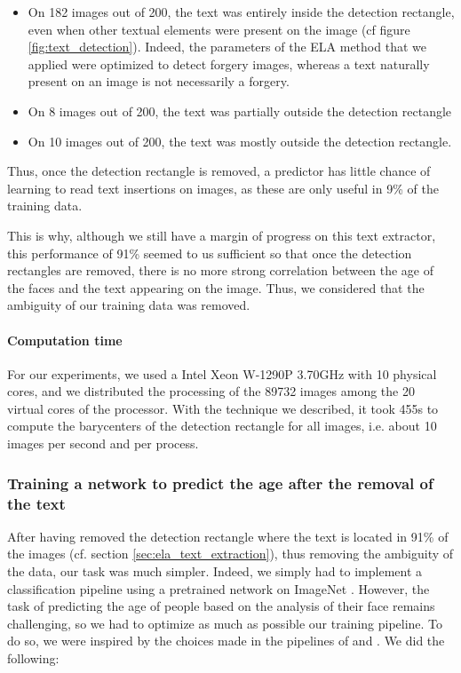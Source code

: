 \documentclass[sigconf, nonacm]{acmart}
\begin{document}
\begin{itemize}
    \item On 182 images out of 200, the text was entirely inside the detection rectangle, even when other textual elements were present on the image (cf figure \ref{fig:text_detection}). Indeed, the parameters of the ELA method that we applied were optimized to detect forgery images, whereas a text naturally present on an image is not necessarily a forgery.
    \item On 8 images out of 200, the text was partially outside the detection rectangle
    \item On 10 images out of 200, the text was mostly outside the detection rectangle.
\end{itemize}

Thus, once the detection rectangle is removed, a predictor has little chance of learning to read text insertions on images, as these are only useful in 9\% of the training data. 

This is why, although we still have a margin of progress on this text extractor, this performance of 91\% seemed to us sufficient so that once the detection rectangles are removed, there is no more strong correlation between the age of the faces and the text appearing on the image. Thus, we considered that the ambiguity of our training data was removed.

\paragraph{Computation time} For our experiments, we used a Intel Xeon W-1290P 3.70GHz with 10 physical cores, and we distributed the processing of the 89732 images among the 20 virtual cores of the processor. With the technique we described, it took 455s to compute the barycenters of the detection rectangle for all images, i.e. about 10 images per second and per process.

\subsubsection{Training a network to predict the age after the removal of the text}

After having removed the detection rectangle where the text is located in 91\% of the images (cf. section \ref{sec:ela_text_extraction}), thus removing the ambiguity of the data, our task was much simpler. Indeed, we simply had to implement a classification pipeline using a pretrained network on ImageNet \cite{deng_imagenet_2009}. However, the task of predicting the age of people based on the analysis of their face remains challenging, so we had to optimize as much as possible our training pipeline. To do so, we were inspired by the choices made in the pipelines of \cite{qawaqneh_deep_2017} and \cite{hiba_hierarchical_2021}. We did the following:
\end{document}
